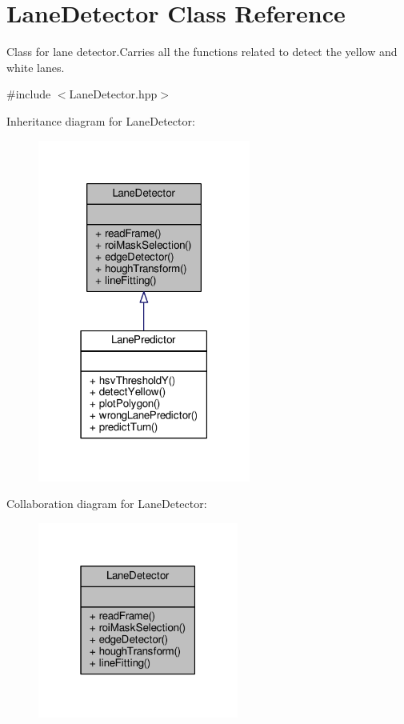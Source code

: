 \hypertarget{classLaneDetector}{}\section{Lane\+Detector Class Reference}
\label{classLaneDetector}


Class for lane detector.\+Carries all the functions related to detect the yellow and white lanes.  




{\ttfamily \#include $<$Lane\+Detector.\+hpp$>$}



Inheritance diagram for Lane\+Detector\+:
\nopagebreak
\begin{figure}[H]
\begin{center}
\leavevmode
\includegraphics[width=198pt]{classLaneDetector__inherit__graph}
\end{center}
\end{figure}


Collaboration diagram for Lane\+Detector\+:
\nopagebreak
\begin{figure}[H]
\begin{center}
\leavevmode
\includegraphics[width=187pt]{classLaneDetector__coll__graph}
\end{center}
\end{figure}
